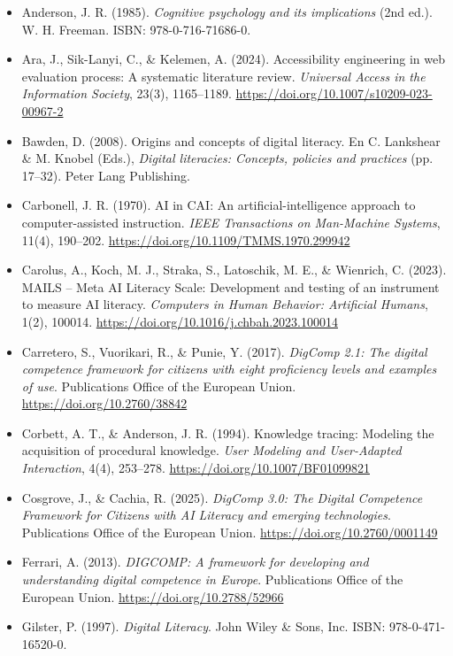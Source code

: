 \begin{itemize}[leftmargin=1.5em, label={}, itemsep=0.22ex, parsep=0pt]
\small\raggedright
{}
    \item Anderson, J. R. (1985). \textit{Cognitive psychology and its implications} (2nd ed.). W. H. Freeman. ISBN: 978-0-716-71686-0.
    \item Ara, J., Sik-Lanyi, C., \& Kelemen, A. (2024). Accessibility engineering in web evaluation process: A systematic literature review. \textit{Universal Access in the Information Society}, 23(3), 1165--1189. \url{https://doi.org/10.1007/s10209-023-00967-2}
    \item Bawden, D. (2008). Origins and concepts of digital literacy. En C. Lankshear \& M. Knobel (Eds.), \textit{Digital literacies: Concepts, policies and practices} (pp. 17--32). Peter Lang Publishing.
    \item Carbonell, J. R. (1970). AI in CAI: An artificial-intelligence approach to computer-assisted instruction. \textit{IEEE Transactions on Man-Machine Systems}, 11(4), 190--202. \url{https://doi.org/10.1109/TMMS.1970.299942}
    \item Carolus, A., Koch, M. J., Straka, S., Latoschik, M. E., \& Wienrich, C. (2023). MAILS – Meta AI Literacy Scale: Development and testing of an instrument to measure AI literacy. \textit{Computers in Human Behavior: Artificial Humans}, 1(2), 100014. \url{https://doi.org/10.1016/j.chbah.2023.100014}
    \item Carretero, S., Vuorikari, R., \& Punie, Y. (2017). \textit{DigComp 2.1: The digital competence framework for citizens with eight proficiency levels and examples of use}. Publications Office of the European Union. \url{https://doi.org/10.2760/38842}
    \item Corbett, A. T., \& Anderson, J. R. (1994). Knowledge tracing: Modeling the acquisition of procedural knowledge. \textit{User Modeling and User-Adapted Interaction}, 4(4), 253--278. \url{https://doi.org/10.1007/BF01099821}
    \item Cosgrove, J., \& Cachia, R. (2025). \textit{DigComp 3.0: The Digital Competence Framework for Citizens with AI Literacy and emerging technologies}. Publications Office of the European Union. \url{https://doi.org/10.2760/0001149}
    \item Ferrari, A. (2013). \textit{DIGCOMP: A framework for developing and understanding digital competence in Europe}. Publications Office of the European Union. \url{https://doi.org/10.2788/52966}
    \item Gilster, P. (1997). \textit{Digital Literacy}. John Wiley \& Sons, Inc. ISBN: 978-0-471-16520-0.

\end{itemize}

